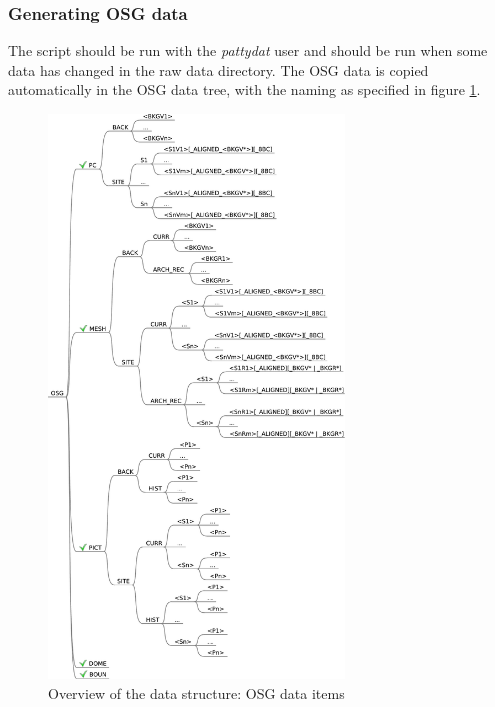 \subsubsection{Generating OSG data}
\label{sec:generateosg}
The script should be run with the \textit{pattydat} user and should be run when some data has
changed in the raw data directory. The OSG data is copied automatically in
the OSG data tree, with the naming as specified in figure
\ref{fig:directory_structure_overview_osg}.
 
\begin{figure}[] \centering
\includegraphics[width=0.7\textwidth]{fig/data_structure/directory_structure_osg}
\caption{Overview of the data structure: OSG data items}
\label{fig:directory_structure_overview_osg} \end{figure}

